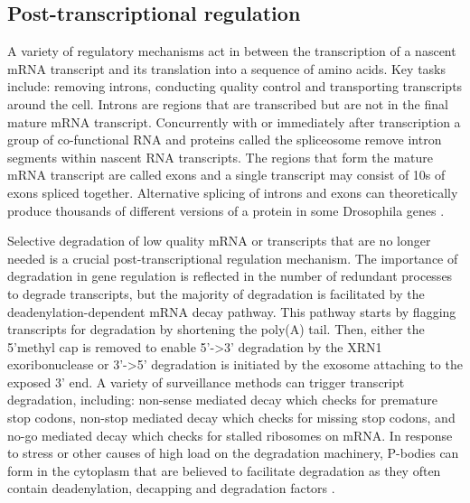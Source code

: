 \documentclass[../main.tex]{subfiles}
\begin{document}
\subsection{Post-transcriptional regulation}

A variety of regulatory mechanisms act in between the transcription of a nascent mRNA transcript and its translation into a sequence of amino acids.
Key tasks include: removing introns, conducting quality control and transporting transcripts around the cell.
Introns are regions that are transcribed but are not in the final mature mRNA transcript.
Concurrently with or immediately after transcription a group of co-functional RNA and proteins called the spliceosome remove intron segments within nascent RNA transcripts.
The regions that form the mature mRNA transcript are called exons and a single transcript may consist of 10s of exons spliced together.
Alternative splicing of introns and exons can theoretically produce thousands of different versions of a protein in some Drosophila genes \parencite{Wilkinson2020}.

Selective degradation of low quality mRNA or transcripts that are no longer needed is a crucial post-transcriptional regulation mechanism.
The importance of degradation in gene regulation is reflected in the number of redundant processes to degrade transcripts, but the majority of degradation is facilitated by the deadenylation-dependent mRNA decay pathway.
This pathway starts by flagging transcripts for degradation by shortening  the poly(A) tail.
Then, either the 5'methyl cap is removed to enable 5'->3' degradation by the XRN1 exoribonuclease or 3'->5' degradation is initiated by the exosome attaching to the exposed 3' end. 
A variety of surveillance methods can trigger transcript degradation, including: non-sense mediated decay which checks for premature stop codons, non-stop mediated decay which checks for missing stop codons, and no-go mediated decay which checks for stalled ribosomes on mRNA.
In response to stress or other causes of high load on the degradation machinery, P-bodies can form in the cytoplasm that are believed to facilitate degradation as they often contain deadenylation, decapping and degradation factors \parencite{Garneau2007}.
\end{document}

